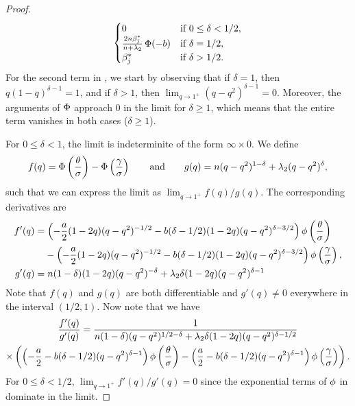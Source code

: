 \begin{proof}
\[    \begin{cases}
      0                                            & \text{if } 0 \leq \delta < 1/2, \\
      \frac{2n \beta_j^*}{n + \lambda_2} \operatorname{\Phi} (-b) & \text{if } \delta = 1/2,        \\
      \beta_j^*                                    & \text{if } \delta > 1/2.
    \end{cases}
  \]
  For the second term in , we start by observing that if
  \(\delta = 1\), then \(q(1-q)^{\delta - 1} = 1\), and if \(\delta > 1\), then \(\lim_{q\rightarrow 1^+}(q - q^2)^{\delta - 1} = 0\). Moreover, the arguments of \(\operatorname{\Phi}\) approach 0 in the limit for \(\delta \geq 1\), which means that the entire term vanishes in both cases (\(\delta \geq 1\)).

  For \(0 \leq \delta < 1\), the limit is indeterminite of the form \(\infty \times 0\). We define
  \[
    f(q) = \operatorname{\Phi} \left(\frac{\theta}{\sigma}\right) - \operatorname{\Phi} \left(\frac{\gamma}{\sigma}\right)
    \qquad\text{and}\qquad
    g(q) = n(q - q^2)^{1-\delta} + \lambda_2(q - q^2)^\delta,
  \]
  such that we can express the limit as \(\lim_{q \rightarrow 1^+}f(q)/g(q)\). The corresponding derivatives are
  \[
    \begin{aligned}
      f'(q) & = \left(-\frac{a}{2}(1-2q)(q - q^2)^{-1/2} - b(\delta - 1/2)(1-2q)(q - q^2)^{\delta - 3/2}\right)\pdf\left(\frac{\theta}{\sigma}\right)                 \\
            & \phantom{= {}} - \left(-\frac{a}{2}(1-2q)(q - q^2)^{-1/2} - b(\delta - 1/2)(1-2q)(q - q^2)^{\delta - 3/2}\right)\pdf\left(\frac{\gamma}{\sigma}\right), \\
      g'(q) & = n(1 - \delta)(1-2q)(q - q^2)^{-\delta} + \lambda_2 \delta(1 - 2q) (q - q^2)^{\delta - 1}
    \end{aligned}
  \]
  Note that \(f(q)\) and \(g(q)\) are both differentiable and \(g'(q) \neq 0\) everywhere in the interval \((1/2, 1)\). Now note that we have
  \begin{multline}
    \label{eq:eval-qlimit-secondterm}
    \frac{f'(q)}{g'(q)} = \frac{1}{n(1-\delta)(q-q^2)^{1/2-\delta} + \lambda_2 \delta (1-2q)(q - q^2)^{\delta-1/2}} \\
    \times \left(\left(-\frac{a}{2} - b(\delta - 1/2)(q - q^2)^{\delta - 1}\right)\operatorname{\phi}\left(\frac{\theta}{\sigma}\right) - \left(\frac{a}{2} - b(\delta - 1/2)(q - q^2)^{\delta - 1}\right)\operatorname{\phi}\left(\frac{\gamma}{\sigma}\right) \right).
  \end{multline}
  For \(0 \leq \delta < 1/2\), $\lim_{q \rightarrow 1^+}f'(q)/g'(q) = 0$ since the exponential terms of \(\operatorname{\phi}\) in  dominate in the limit.


\end{proof}
